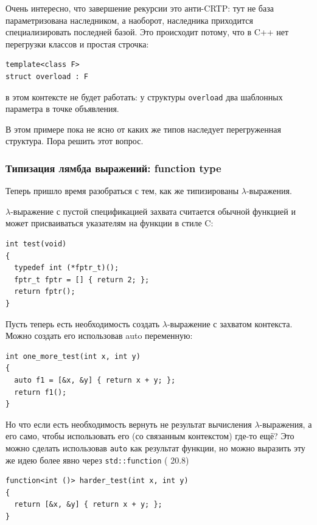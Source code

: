 \documentclass[a4paper,12pt,oneside]{article}
\begin{document}
Очень интересно, что завершение рекурсии это анти-CRTP: тут не база параметризована наследником, а наоборот, наследника приходится специализировать последней базой. Это происходит потому, что в C++ нет перегрузки классов и простая строчка:

\begin{lstlisting}
template<class F>
struct overload : F
\end{lstlisting}

в этом контексте не будет работать: у структуры \lstinline!overload! два шаблонных параметра в точке объявления.

В этом примере пока не ясно от каких же типов наследует перегруженная структура. Пора решить этот вопрос.

\subsubsection{Типизация лямбда выражений: function type}\label{StdFunction}

Теперь пришло время разобраться с тем, как же типизированы $\lambda$-выражения.

$\lambda$-выражение с пустой спецификацией захвата считается обычной функцией и может присваиваться указателям на функции в стиле C:

\begin{lstlisting}
int test(void)
{
  typedef int (*fptr_t)();
  fptr_t fptr = [] { return 2; };
  return fptr();
}
\end{lstlisting}

Пусть теперь есть необходимость создать $\lambda$-выражение с захватом контекста. Можно создать его использовав auto переменную:

\begin{lstlisting}
int one_more_test(int x, int y)
{
  auto f1 = [&x, &y] { return x + y; };
  return f1(); 
}
\end{lstlisting}

Но что если есть необходимость вернуть не результат вычисления $\lambda$-выражения, а его само, чтобы использовать его (со связанным контекстом) где-то ещё? Это можно сделать использовав \lstinline!auto! как результат функции, но можно выразить эту же идею более явно через \lstinline!std::function! (\cite{stdcpp14} 20.8)
 
\begin{lstlisting}
function<int ()> harder_test(int x, int y)
{
  return [&x, &y] { return x + y; };
}
\end{lstlisting}
\end{document}
